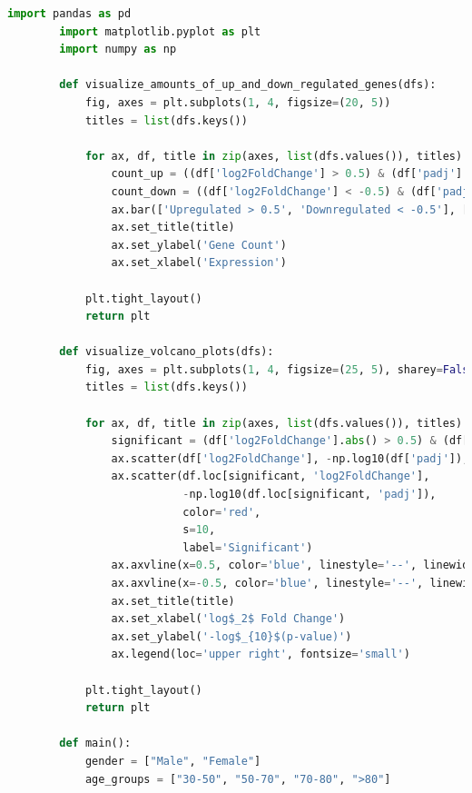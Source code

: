 \documentclass[12pt]{report}
\begin{document}
    \begin{lstlisting}[language=Python,caption={process\_deg\_consolidated\_visits.py: Κατασκευή γραφημάτων διαφορικά εκφραζομένων γονιδίων}, label=lst:processdegconsolidatedvisitspy]
        import pandas as pd
        import matplotlib.pyplot as plt
        import numpy as np
        
        def visualize_amounts_of_up_and_down_regulated_genes(dfs):
            fig, axes = plt.subplots(1, 4, figsize=(20, 5))
            titles = list(dfs.keys())
        
            for ax, df, title in zip(axes, list(dfs.values()), titles):
                count_up = ((df['log2FoldChange'] > 0.5) & (df['padj'] < 0.05)).sum()
                count_down = ((df['log2FoldChange'] < -0.5) & (df['padj'] < 0.05)).sum()
                ax.bar(['Upregulated > 0.5', 'Downregulated < -0.5'], [count_up, count_down], color=['red', 'blue'])
                ax.set_title(title)
                ax.set_ylabel('Gene Count')
                ax.set_xlabel('Expression')
        
            plt.tight_layout()
            return plt
        
        def visualize_volcano_plots(dfs):
            fig, axes = plt.subplots(1, 4, figsize=(25, 5), sharey=False)
            titles = list(dfs.keys())
        
            for ax, df, title in zip(axes, list(dfs.values()), titles):
                significant = (df['log2FoldChange'].abs() > 0.5) & (df['padj'] < 0.05)
                ax.scatter(df['log2FoldChange'], -np.log10(df['padj']), color='gray', s=10, alpha=0.6, label='Non-significant')
                ax.scatter(df.loc[significant, 'log2FoldChange'],
                           -np.log10(df.loc[significant, 'padj']),
                           color='red',
                           s=10,
                           label='Significant')
                ax.axvline(x=0.5, color='blue', linestyle='--', linewidth=0.8)
                ax.axvline(x=-0.5, color='blue', linestyle='--', linewidth=0.8)
                ax.set_title(title)
                ax.set_xlabel('log$_2$ Fold Change')
                ax.set_ylabel('-log$_{10}$(p-value)')
                ax.legend(loc='upper right', fontsize='small')
        
            plt.tight_layout()
            return plt
        
        def main():
            gender = ["Male", "Female"]
            age_groups = ["30-50", "50-70", "70-80", ">80"]
        

\end{lstlisting}
\end{document}
